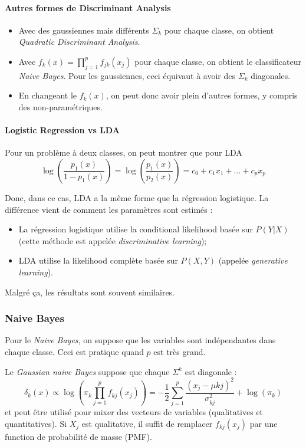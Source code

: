         \paragraph{Autres formes de Discriminant Analysis}
            \begin{itemize}
                \item Avec des gaussiennes mais différents \(\Sigma_k\) pour chaque classe, on obtient \textit{Quadratic Discriminant Analysis}.
                \item Avec \(f_k(x) = \prod_{j=1}^p f_{jk}(x_j)\) pour chaque classe, on obtient le classificateur \textit{Naive Bayes}. Pour les gaussiennes, ceci équivaut à avoir des \(\Sigma_k\) diagonales.
                \item En changeant le \(f_k(x)\), on peut donc avoir plein d'autres formes, y compris des non-paramétriques.
            \end{itemize}

        \paragraph{Logistic Regression vs LDA}
            Pour un problème à deux classes, on peut montrer que pour LDA
            \[
                \log\left(\frac{p_1(x)}{1 - p_1(x)}\right) = \log\left(\frac{p_1(x)}{p_2(x)}\right) = c_0 + c_1 x_1 + \dots + c_p x_p
            \]

            Donc, dans ce cas, LDA a la même forme que la régression logistique. La différence vient de comment les paramètres sont estimés :
            \begin{itemize}
                \item La régression logistique utilise la conditional likelihood basée sur \(P(Y | X)\) (cette méthode est appelée \textit{discriminative learning});
                \item LDA utilise la likelihood complète basée sur \(P(X, Y)\) (appelée \textit{generative learning}).
            \end{itemize}
            Malgré ça, les résultats sont souvent similaires.

    \subsubsection{Naive Bayes}
        \begin{definition}
            Pour le \textit{Naive Bayes}, on suppose que les variables sont indépendantes dans chaque classe. Ceci est pratique quand \(p\) est très grand.

            Le \textit{Gaussian naive Bayes} suppose que chaque \(\Sigma^k\) est diagonale :
            \[
                \delta_k(x) \propto \log\left(\pi_k \prod_{j=1}^p f_{kj}(x_j)\right) = - \frac{1}{2} \sum_{j=1}^p \frac{(x_j - \mu{kj})^2}{\sigma_{kj}^2} + \log(\pi_k)
            \]
            et peut être utilisé pour mixer des vecteurs de variables (qualitatives et quantitatives). Si \(X_j\) est qualitative, il suffit de remplacer \(f_{kj}(x_j)\) par une function de probabilité de masse (PMF).
        \end{definition}